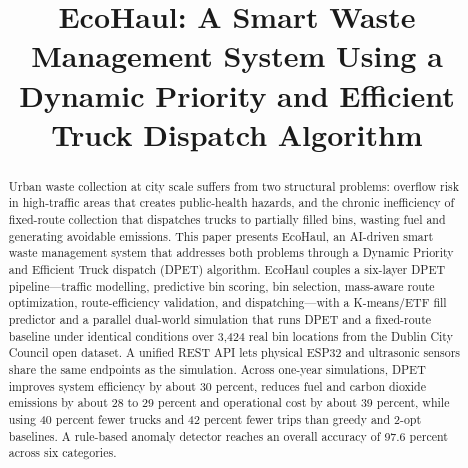 \documentclass[conference, a4paper]{IEEEtran}
\begin{document}
\title{EcoHaul: A Smart Waste Management System Using a Dynamic Priority and Efficient Truck Dispatch Algorithm}

\makeatletter
\def\@IEEEauthorblockNfont{\fontsize{11pt}{13pt}\selectfont}
\def\@IEEEauthorblockAfont{\fontsize{10pt}{12pt}\selectfont}
\makeatother

\author{
\and
{}
}

\maketitle

\begin{abstract}
Urban waste collection at city scale suffers from two structural problems: overflow risk in high-traffic areas that creates public-health hazards, and the chronic inefficiency of fixed-route collection that dispatches trucks to partially filled bins, wasting fuel and generating avoidable emissions. This paper presents EcoHaul, an AI-driven smart waste management system that addresses both problems through a Dynamic Priority and Efficient Truck dispatch (DPET) algorithm. EcoHaul couples a six-layer DPET pipeline---traffic modelling, predictive bin scoring, bin selection, mass-aware route optimization, route-efficiency validation, and dispatching---with a K-means/ETF fill predictor and a parallel dual-world simulation that runs DPET and a fixed-route baseline under identical conditions over 3{,}424 real bin locations from the Dublin City Council open dataset. A unified REST API lets physical ESP32 and ultrasonic sensors share the same endpoints as the simulation. Across one-year simulations, DPET improves system efficiency by about 30 percent, reduces fuel and carbon dioxide emissions by about 28 to 29 percent and operational cost by about 39 percent, while using 40 percent fewer trucks and 42 percent fewer trips than greedy and 2-opt baselines. A rule-based anomaly detector reaches an overall accuracy of 97.6 percent across six categories.
\end{abstract}
\end{document}
